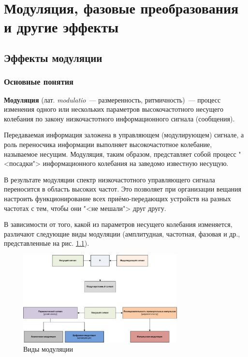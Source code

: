 \documentclass[oneside, final, 14pt]{extreport}
\begin{document}
\setcounter{chapter}{7}
\chapter{Модуляция, фазовые преобразования и другие эффекты}
\tableofcontents

\section{Эффекты модуляции}
\subsection{Основные понятия}
\textbf{Модуляция} (лат. \textit{modulatio}~--- размеренность, ритмичность)~--- процесс изменения одного или нескольких параметров высокочастотного несущего колебания по закону низкочастотного информационного сигнала (сообщения).

Передаваемая информация заложена в управляющем (модулирующем) сигнале, а роль переносчика информации выполняет высокочастотное колебание, называемое несущим. Модуляция, таким образом, представляет собой процесс "<посадки"> информационного колебания на заведомо известную несущую.

В результате модуляции спектр низкочастотного управляющего сигнала переносится в область высоких частот. Это позволяет при организации вещания настроить функционирование всех приёмо-передающих устройств на разных частотах с тем, чтобы они "<не мешали"> друг другу.

В зависимости от того, какой из параметров несущего колебания изменяется, различают следующие виды модуляции (амплитудная, частотная, фазовая и др., представленные на рис. \ref{pic-modulation-01}).

\begin{figure}[h!]
  \centering
  \includegraphics[width=0.75\textwidth]{pic-modulation-01}
  \caption{Виды модуляции}
  \label{pic-modulation-01}
\end{figure}
\end{document}
